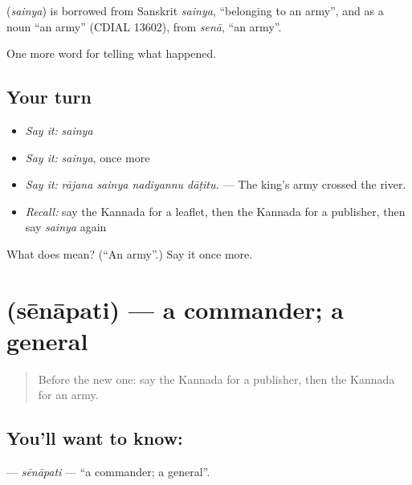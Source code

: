 \begin{cousinweb}
\textbf{} (\emph{sainya}) is borrowed from Sanskrit \emph{sainya}, \textquotedblleft{}belonging to an army\textquotedblright{}, and as a noun \textquotedblleft{}an army\textquotedblright{} (CDIAL 13602), from \emph{senā}, \textquotedblleft{}an army\textquotedblright{}.
\end{cousinweb}

\begin{grammarlens}[title={What you've built}]
One more word for telling what happened.
\end{grammarlens}

\subsection*{Your turn}
\begin{itemize}
\raggedright
  \item \emph{Say it:} \emph{sainya}
  \item \emph{Say it:} \emph{sainya}, once more
  \item \emph{Say it:} \emph{rājana sainya nadiyannu dāṭitu.} — The king's army crossed the river.
  \item \emph{Recall:} say the Kannada for a leaflet, then the Kannada for a publisher, then say \emph{sainya} again
\end{itemize}

\begin{tcolorbox}[breakable,colback=teal!4,colframe=teal!35!black,title={Before you move on}]
What does  mean? (\textquotedblleft{}An army\textquotedblright{}.) Say it once more.
\end{tcolorbox}
\section[\texorpdfstring{\kn{ಸೇನಾಪತಿ} (sēnāpati)}{ಸೇನಾಪತಿ (sēnāpati)}]{ (sēnāpati) — a commander; a general}

\label{lesson:KA-C336-senapati}



\begin{quote}
Before the new one: say the Kannada for a publisher, then the Kannada for an army.
\end{quote}

\subsection*{You'll want to know: }
\textbf{} — \emph{sēnāpati} — \textquotedblleft{}a commander; a general\textquotedblright{}.

